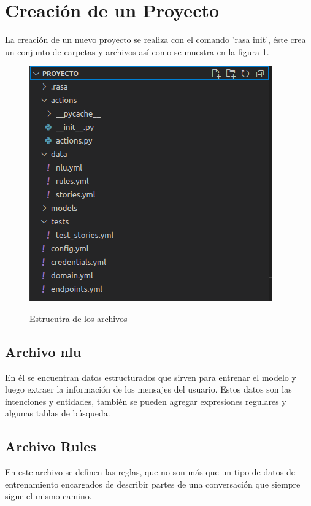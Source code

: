 \section{Creación de un Proyecto}
\indent La creación de un nuevo proyecto se realiza con el comando 'rasa init', éste crea un
conjunto de carpetas y archivos así como se muestra en la figura \ref{fig:Estructura}.
\begin{figure}[h]
	\centering
	\includegraphics[width=\textwidth]{imagenes/cap3/4_Estructura del Proyecto.png}
	\caption{Estrucutra de los archivos}
	\label{fig:Estructura}
	\cite{Rasa}
\end{figure}
\subsection{Archivo nlu}
En él se encuentran datos estructurados que sirven para entrenar el modelo y luego extraer la
información de los mensajes del usuario. Estos datos son  las intenciones y entidades, también se
pueden agregar expresiones regulares y algunas tablas de búsqueda. \cite{NLU_Documentation}

\subsection{Archivo Rules}
En este archivo se definen las reglas, que no son más que un tipo de datos de entrenamiento
encargados de describir partes de una conversación que siempre sigue el mismo
camino.\cite{Rules_Documentation}

